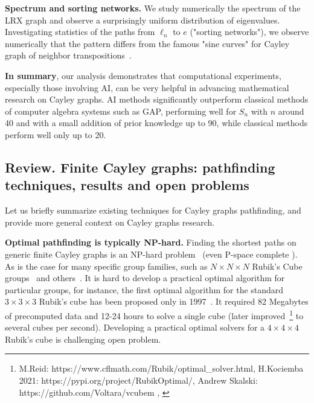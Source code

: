 \documentclass[reqno,11pt]{amsart}
\begin{document}
{\bf Spectrum and sorting networks.}
We study numerically the spectrum of the LRX graph and observe a surprisingly uniform distribution of eigenvalues. Investigating statistics of the paths from $\ell_n$ to $e$ ("sorting networks"), we observe numerically that the pattern differs from the famous "sine curves" for Cayley graph of neighbor transpositions~\cite{angel2007random}.



{\bf In summary}, our analysis demonstrates that computational experiments, especially those involving AI, can be very helpful in advancing mathematical research on Cayley graphs. AI methods significantly outperform classical methods of computer algebra systems such as GAP, performing well for $S_n$ with $n$ around 40 and with a small addition of prior knowledge up to 90, while classical methods perform well only up to 20. 

\subsection{Review. Finite Cayley graphs: pathfinding techniques, results and open problems}

Let us briefly summarize existing techniques for Cayley graphs pathfinding, and provide more general context on Cayley graphs research.

{\bf Optimal pathfinding is typically NP-hard.} Finding the shortest paths on generic finite Cayley graphs is an NP-hard problem~\cite{even1981minimum} (even P-space complete \cite{jerrum1985complexity}). As is the case for many specific group families, such as $N\times N \times N$ Rubik's Cube groups~\cite{demaine2017solving} and others~\cite{bulteau2015pancake}.
It is hard to develop a practical optimal algorithm for particular groups, for instance, the first optimal algorithm for the standard $3\times 3 \times 3$ Rubik's cube has been proposed only in 1997~\cite{korf1997finding}. It required 82 Megabytes of precomputed data and 12-24 hours to solve a single cube (later improved~\footnote{M.Reid: https://www.cflmath.com/Rubik/optimal\_solver.html, H.Kociemba 2021: https://pypi.org/project/RubikOptimal/, Andrew Skalski:  https://github.com/Voltara/vcubem , \cite{Rokicki2014Diameter} }%
to several cubes per second). Developing a practical optimal solvers for a $4\times 4 \times 4$ Rubik's cube is challenging open problem. 
\end{document}

